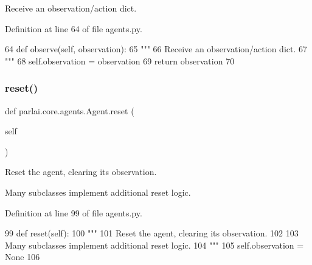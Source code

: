 \begin{DoxyVerb}Receive an observation/action dict.
\end{DoxyVerb}
 

Definition at line 64 of file agents.\+py.


\begin{DoxyCode}
64     \textcolor{keyword}{def }observe(self, observation):
65         \textcolor{stringliteral}{"""}
66 \textcolor{stringliteral}{        Receive an observation/action dict.}
67 \textcolor{stringliteral}{        """}
68         self.observation = observation
69         \textcolor{keywordflow}{return} observation
70 
\end{DoxyCode}
\mbox{\label{classparlai_1_1core_1_1agents_1_1Agent_a27cb8206372681605b00dc28b81a7c39}} 
\subsubsection{\texorpdfstring{reset()}{reset()}}
{\footnotesize\ttfamily def parlai.\+core.\+agents.\+Agent.\+reset (\begin{DoxyParamCaption}\item[{}]{self }\end{DoxyParamCaption})}

\begin{DoxyVerb}Reset the agent, clearing its observation.

Many subclasses implement additional reset logic.
\end{DoxyVerb}
 

Definition at line 99 of file agents.\+py.


\begin{DoxyCode}
99     \textcolor{keyword}{def }reset(self):
100         \textcolor{stringliteral}{"""}
101 \textcolor{stringliteral}{        Reset the agent, clearing its observation.}
102 \textcolor{stringliteral}{}
103 \textcolor{stringliteral}{        Many subclasses implement additional reset logic.}
104 \textcolor{stringliteral}{        """}
105         self.observation = \textcolor{keywordtype}{None}
106 
\end{DoxyCode}
\mbox{\label{classparlai_1_1core_1_1agents_1_1Agent_aaefcbd7c61d319b368b3ee13997c8c99}} 
